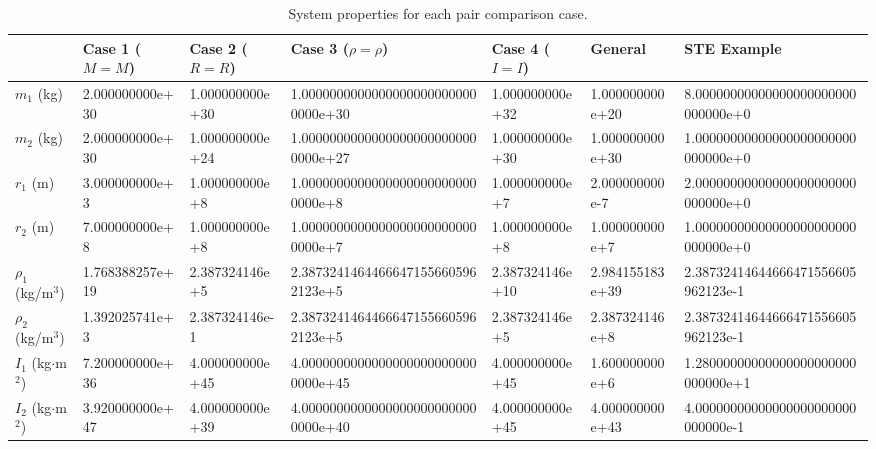 \begin{table}[ht]
\centering
\caption{System properties for each pair comparison case.}
\label{tab:pair_properties}
\scriptsize
\setlength{\tabcolsep}{2pt}
\begin{tabular}{@{} l l l l l l l @{}}
\toprule
 & \textbf{Case 1 ($M\!=\!M$)} & \textbf{Case 2 ($R\!=\!R$)} & \textbf{Case 3 ($\rho\!=\!\rho$)} & \textbf{Case 4 ($I\!=\!I$)} & \textbf{General} & \textbf{STE Example} \\
\midrule
$m_1$ (kg) & {\ttfamily 2.000000000e+30} & {\ttfamily 1.000000000e+30} & {\ttfamily 1.00000000000000000000000000000e+30} & {\ttfamily 1.000000000e+32} & {\ttfamily 1.000000000e+20} & {\ttfamily 8.00000000000000000000000000000e+0} \\
$m_2$ (kg) & {\ttfamily 2.000000000e+30} & {\ttfamily 1.000000000e+24} & {\ttfamily 1.00000000000000000000000000000e+27} & {\ttfamily 1.000000000e+30} & {\ttfamily 1.000000000e+30} & {\ttfamily 1.00000000000000000000000000000e+0} \\
$r_1$ (m) & {\ttfamily 3.000000000e+3} & {\ttfamily 1.000000000e+8} & {\ttfamily 1.00000000000000000000000000000e+8} & {\ttfamily 1.000000000e+7} & {\ttfamily 2.000000000e-7} & {\ttfamily 2.00000000000000000000000000000e+0} \\
$r_2$ (m) & {\ttfamily 7.000000000e+8} & {\ttfamily 1.000000000e+8} & {\ttfamily 1.00000000000000000000000000000e+7} & {\ttfamily 1.000000000e+8} & {\ttfamily 1.000000000e+7} & {\ttfamily 1.00000000000000000000000000000e+0} \\
$\rho_1$ (kg/m$^3$) & {\ttfamily 1.768388257e+19} & {\ttfamily 2.387324146e+5} & {\ttfamily 2.38732414644666471556605962123e+5} & {\ttfamily 2.387324146e+10} & {\ttfamily 2.984155183e+39} & {\ttfamily 2.38732414644666471556605962123e-1} \\
$\rho_2$ (kg/m$^3$) & {\ttfamily 1.392025741e+3} & {\ttfamily 2.387324146e-1} & {\ttfamily 2.38732414644666471556605962123e+5} & {\ttfamily 2.387324146e+5} & {\ttfamily 2.387324146e+8} & {\ttfamily 2.38732414644666471556605962123e-1} \\
$I_1$ (kg$\cdot$m$^2$) & {\ttfamily 7.200000000e+36} & {\ttfamily 4.000000000e+45} & {\ttfamily 4.00000000000000000000000000000e+45} & {\ttfamily 4.000000000e+45} & {\ttfamily 1.600000000e+6} & {\ttfamily 1.28000000000000000000000000000e+1} \\
$I_2$ (kg$\cdot$m$^2$) & {\ttfamily 3.920000000e+47} & {\ttfamily 4.000000000e+39} & {\ttfamily 4.00000000000000000000000000000e+40} & {\ttfamily 4.000000000e+45} & {\ttfamily 4.000000000e+43} & {\ttfamily 4.00000000000000000000000000000e-1} \\

\end{tabular}
\end{table}
